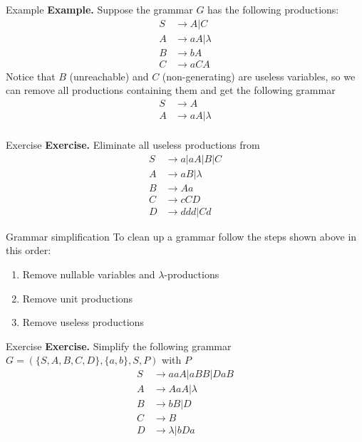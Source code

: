 \documentclass[10pt]{beamer}
\begin{document}
\begin{frame}{Example}
    \textbf{Example.} Suppose the grammar $G$ has the following productions:
    \begin{align*}
        S & \rightarrow A | C        \\
        A & \rightarrow aA | \lambda \\
        B & \rightarrow bA           \\
        C & \rightarrow aCA
    \end{align*}
    Notice that $B$ (unreachable) and $C$ (non-generating) are useless variables, so we can remove all productions containing them and get the following grammar
    \begin{align*}
        S & \rightarrow A            \\
        A & \rightarrow aA | \lambda \\
    \end{align*}
\end{frame}

\begin{frame}[t]{Exercise}
    \textbf{Exercise.} Eliminate all useless productions from
    \begin{align*}
        S & \rightarrow a| aA | B | C \\
        A & \rightarrow aB | \lambda  \\
        B & \rightarrow Aa            \\
        C & \rightarrow cCD           \\
        D & \rightarrow ddd| Cd
    \end{align*}
\end{frame}


\begin{frame}{Grammar simplification}
    To clean up a grammar follow the steps shown above in this order:
    \begin{enumerate}
        \item Remove nullable variables and $\lambda$-productions
        \item Remove unit productions
        \item Remove useless productions
    \end{enumerate}
\end{frame}

\begin{frame}[t]{Exercise}
    \textbf{Exercise.} Simplify the following grammar $G = (\{S,A,B,C,D\}, \{a,b\}, S, P) $ with $P$
    \begin{align*}
        S & \rightarrow aaA | aBB | DaB \\
        A & \rightarrow AaA | \lambda   \\
        B & \rightarrow bB | D          \\
        C & \rightarrow B               \\
        D & \rightarrow \lambda | bDa
    \end{align*}
\end{frame}
\end{document}
